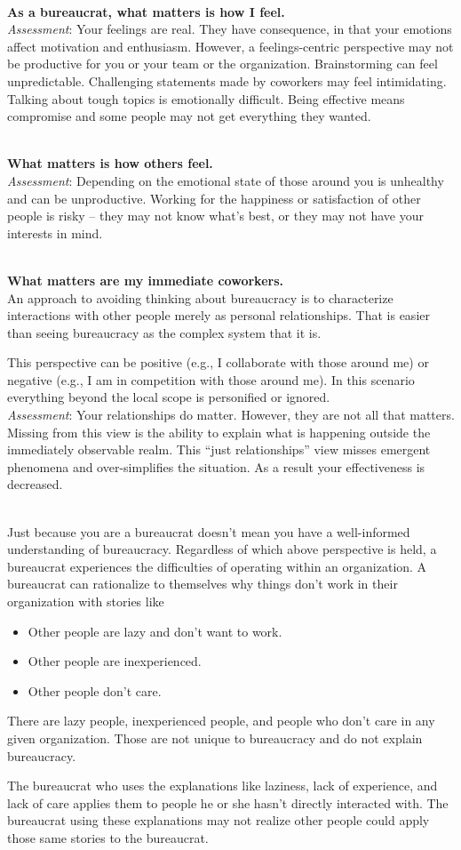 \ \\
\textbf{As a bureaucrat, what matters is how I feel.} \\
\textit{Assessment}: Your feelings are real. They have consequence, in that your emotions affect motivation and enthusiasm. However, a feelings-centric perspective may not be productive for you or your team or the organization. Brainstorming can feel unpredictable. Challenging statements made by coworkers may feel intimidating. Talking about tough topics is emotionally difficult. 
Being effective means compromise and some people may not get everything they wanted. %

\ \\ 
\textbf{What matters is how others feel.}\\
\textit{Assessment}: Depending on the emotional state of those around you is unhealthy and can be unproductive. Working for the happiness or satisfaction of other people is risky -- they may not know what's best, or they may not have your interests in mind.

\ \\
\textbf{What matters are my immediate coworkers.}\\
An approach to avoiding thinking about bureaucracy is to characterize interactions with other people merely as personal relationships. That is easier than seeing bureaucracy as the complex system that it is.

This perspective can be positive (e.g., I collaborate with those around me) or negative (e.g., I am in competition with those around me).
In this scenario everything beyond the local scope is personified or ignored.  \\
\textit{Assessment}: Your relationships do matter. However, they are not all that matters. Missing from this view is the ability to explain what is happening outside the immediately observable realm. 
This ``just relationships'' view misses emergent phenomena and over-simplifies the situation. As a result your effectiveness is decreased.





\ \\

Just because you are a bureaucrat doesn't mean you have a well-informed understanding of bureaucracy. Regardless of which above perspective is held, a bureaucrat experiences the difficulties of operating within an organization. A bureaucrat can rationalize to themselves why things don't work in their organization with stories like
\begin{itemize}
\item Other people are lazy and don't want to work.
\item Other people are inexperienced.
\item Other people don't care.
\end{itemize}
There are lazy people, inexperienced people, and people who don't care in any given organization. Those are not unique to bureaucracy and do not explain bureaucracy.

The bureaucrat who uses the explanations like laziness, lack of experience, and lack of care applies them to people he or she hasn't directly interacted with.  The bureaucrat using these explanations may not realize other people could apply those same stories to the bureaucrat. 